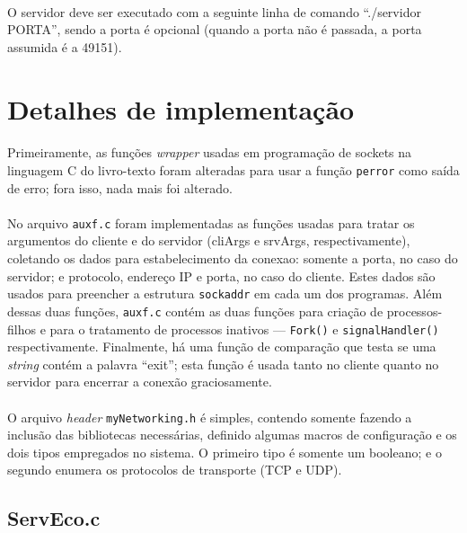 \documentclass[a4paper,10pt,oneside,final,titlepage,onecolumn]{article}
\begin{document}
\paragraph{}O servidor deve ser executado com a seguinte linha de comando ``./servidor PORTA'', sendo a porta é opcional (quando a porta não é passada, a porta assumida é a 49151).



\FloatBarrier
\section{Detalhes de implementação}
\paragraph{}Primeiramente, as funções \emph{wrapper} usadas em programação de sockets na linguagem C do livro-texto foram alteradas para usar a função \verb|perror| como saída de erro; fora isso, nada mais foi alterado.
\paragraph{}No arquivo \verb|auxf.c| foram implementadas as funções usadas para tratar os argumentos do cliente e do servidor (cliArgs e srvArgs, respectivamente), coletando os dados para estabelecimento da conexao: somente a porta, no caso do servidor; e protocolo, endereço IP e porta, no caso do cliente. Estes dados são usados para preencher a estrutura \verb|sockaddr| em cada um dos programas. Além dessas duas funções, \verb|auxf.c| contém as duas funções para criação de processos-filhos e para o tratamento de processos inativos --- \verb|Fork()| e \verb|signalHandler()| respectivamente. Finalmente, há uma função de comparação que testa se uma \emph{string} contém a palavra ``exit''; esta função é usada tanto no cliente quanto no servidor para encerrar a conexão graciosamente.
\paragraph{}O arquivo \emph{header} \verb|myNetworking.h| é simples, contendo somente fazendo a inclusão das bibliotecas necessárias, definido algumas macros de configuração e os dois tipos empregados no sistema. O primeiro tipo é somente um booleano; e o segundo enumera os protocolos de transporte (TCP e UDP).
\subsection{ServEco.c}
\end{document}
